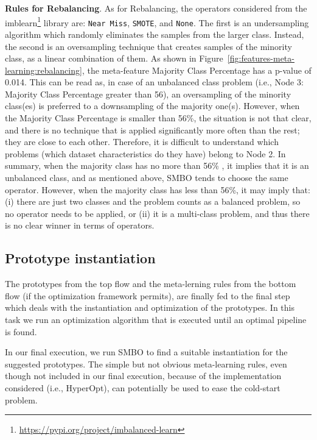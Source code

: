 \begin{example}
\textbf{Rules for Rebalancing}. As for Rebalancing, the operators considered from the imblearn\footnote{\url{https://pypi.org/project/imbalanced-learn}} library are: \texttt{Near Miss}, \texttt{SMOTE}, and \texttt{None}. %
The first is an undersampling algorithm which randomly eliminates the samples from the larger class.
Instead, the second is an oversampling technique that creates samples of the minority class, as a linear combination of them.
As shown in Figure~\ref{fig:features-meta-learning:rebalancing}, the meta-feature Majority Class Percentage has a p-value of 0.014.
This can be read as, in case of an unbalanced class problem (i.e., Node 3: Majority Class Percentage greater than 56), an oversampling of the minority class(es) is preferred to a downsampling of the majority one(s).
However, when the Majority Class Percentage is smaller than 56\%, the situation is not that clear, and there is no technique that is applied significantly more often than the rest; they are close to each other.
Therefore, it is difficult to understand which problems (which dataset characteristics do they have) belong to Node 2.
In summary, when the majority class has no more than 56\% , it implies that it is an unbalanced class, and as mentioned above, SMBO tends to choose the same operator. However, when the majority class has less than 56\%, it may imply that: (i) there are just two classes and the problem counts as a balanced problem, so no operator needs to be applied, or (ii) it is a multi-class problem, and thus there is no clear winner in terms of operators. 
\end{example}


\subsection{Prototype instantiation}

The prototypes from the top flow and the meta-lerning rules from the bottom flow (if the optimization framework permits), are finally fed to the final step which deals with the instantiation and optimization of the prototypes. In this task we run an optimization algorithm that is executed until an optimal pipeline is found.

\begin{example}
 In our final execution, we run SMBO to find a suitable instantiation for the suggested prototypes. The simple but not obvious meta-learning rules, even though not included in our final execution, because of the implementation considered (i.e., HyperOpt), can potentially be used to ease the cold-start problem. 
\end{example}

